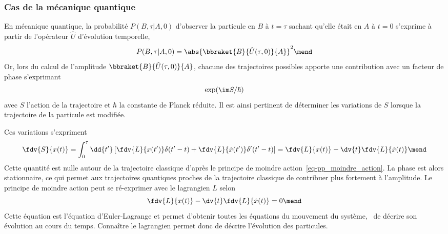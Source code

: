 \subsubsection{Cas de la mécanique quantique}%
En mécanique quantique,
la probabilité $P(B,\tau|A,0)$ d'observer la particule en $B$ à $t=\tau$ sachant qu'elle était en $A$ à $t=0$
s'exprime à partir de l'opérateur $\hat{U}$ d'évolution temporelle,
\begin{equation}
P(B,\tau|A,0) = \abs{ \bbraket{B}{\hat{U}(\tau,0)}{A} }^2
\mend
\end{equation}
Or, lors du calcul de l'amplitude $\bbraket{B}{\hat{U}(\tau,0)}{A}$,
chacune des trajectoires possibles apporte une contribution
avec un facteur de phase s'exprimant
\begin{equation}
\exp( \im S / \hbar )
\end{equation}
avec $S$ l'action de la trajectoire
et
$\hbar$ la constante de Planck réduite.
Il est ainsi pertinent de déterminer les variations de $S$ lorsque la trajectoire de la particule est modifiée.
\par
Ces variations s'expriment
\begin{equation}
\fdv{S}{x(t)}
= \int_0^\tau\dd{t'} \left[ \fdv{L}{x(t')}\delta(t'-t) + \fdv{L}{\dot{x}(t')}\delta'(t'-t)\right]
= \fdv{L}{x(t)} - \dv{t}\fdv{L}{\dot{x}(t)}
\mend
\end{equation}
Cette quantité est nulle autour de la trajectoire classique d'après le principe de moindre action~\eqref{eq-pp_moindre_action}.
La phase est alors stationnaire, ce qui permet aux trajectoires quantiques proches de la trajectoire classique de contribuer plus fortement à l'amplitude.
Le principe de moindre action peut se ré-exprimer avec le lagrangien $L$ selon
\begin{equation}
\fdv{L}{x(t)} - \dv{t}\fdv{L}{\dot{x}(t)} = 0
\mend
\end{equation}
Cette équation est l'équation d'Euler-Lagrange et permet d'obtenir toutes les équations du mouvement du système, \ie\ de décrire son évolution au cours du temps.
Connaître le lagrangien permet donc de décrire l'évolution des particules.

